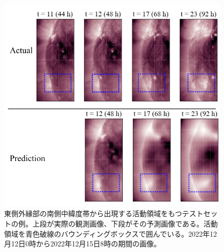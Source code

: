         \begin{figure}[htbp]
          \centering
          \includegraphics[width=\textwidth]{figures/exp1/limb_sample_12_caption.jpg}
          \caption{東側外縁部の南側中緯度帯から出現する活動領域をもつテストセットの例。上段が実際の観測画像、下段がその予測画像である。活動領域を青色破線のバウンディングボックスで囲んでいる。2022年12月12日0時から2022年12月15日8時の期間の画像。}
          \label{fig:exp1_limb_example_2}
        \end{figure}

